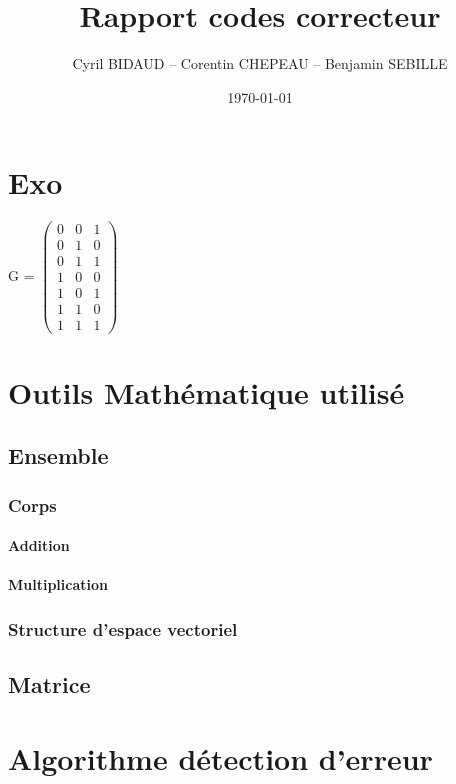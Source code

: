 \documentclass[a4paper,10pt]{report}
\begin{document}
\title{Rapport codes correcteur}
\author{Cyril BIDAUD -- Corentin CHEPEAU -- Benjamin SEBILLE}
\date{\today} 

\maketitle


\tableofcontents

\chapter*{Exo}
G = $\begin{pmatrix}
   0 & 0 & 1\\
   0 & 1 & 0\\
   0 & 1 & 1\\
   1 & 0 & 0\\
   1 & 0 & 1\\
   1 & 1 & 0\\
   1 & 1 & 1 
\end{pmatrix}$

\chapter{Outils Mathématique utilisé}
	\section{Ensemble}
		\subsection{Corps}
			\subsubsection{Addition}

			\subsubsection{Multiplication}

		\subsection{Structure d'espace vectoriel}



	\section{Matrice}
\chapter{Algorithme détection d'erreur}
\end{document}
